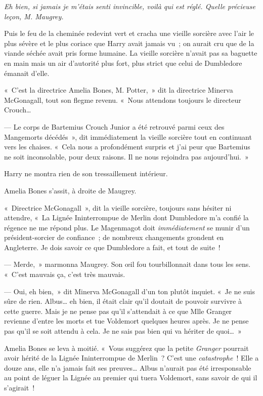 \emph{Eh bien, si jamais je m'étais senti invincible, voilà qui est réglé.
Quelle précieuse leçon, M. Maugrey.}

Puis le feu de la cheminée redevint vert et cracha une vieille sorcière avec l'air le plus sévère et le plus coriace que Harry avait jamais vu~; on aurait cru que de la viande séchée avait pris forme humaine.
La vieille sorcière n'avait pas sa baguette en main mais un air d'autorité plus fort, plus strict que celui de Dumbledore émanait d'elle.

«~C'est la directrice Amelia Bones, M. Potter,~» dit la directrice Minerva McGonagall, tout son flegme revenu.
«~Nous attendons toujours le directeur Crouch…

--- Le corps de Bartemius Crouch Junior a été retrouvé parmi ceux des Mangemorts décédés~», dit immédiatement la vieille sorcière tout en continuant vers les chaises.
«~Cela nous a profondément surpris et j'ai peur que Bartemius ne soit inconsolable, pour deux raisons.
Il ne nous rejoindra pas aujourd'hui.~»

Harry ne montra rien de son tressaillement intérieur.

Amelia Bones s'assit, à droite de Maugrey.

«~Directrice McGonagall~», dit la vieille sorcière, toujours sans hésiter ni attendre, «~La Lignée Ininterrompue de Merlin dont Dumbledore m'a confié la régence ne me répond plus.
Le Magenmagot doit \emph{immédiatement} se munir d'un président-sorcier de confiance~; de nombreux changements grondent en Angleterre.
Je dois savoir ce que Dumbledore a fait, et tout de suite~!

--- Merde,~» marmonna Maugrey.
Son œil fou tourbillonnait dans tous les sens.
«~C'est mauvais ça, c'est très mauvais.

--- Oui, eh bien,~» dit Minerva McGonagall d'un ton plutôt inquiet.
«~Je ne suis sûre de rien.
Albus… eh bien, il était clair qu'il doutait de pouvoir survivre à cette guerre.
Mais je ne pense pas qu'il s'attendait à ce que Mlle Granger revienne d'entre les morts et tue Voldemort quelques heures après.
Je ne pense pas qu'il se soit attendu à cela.
Je ne sais pas bien qui va hériter de quoi…~»

Amelia Bones se leva à moitié.
«~Vous suggérez que la petite \emph{Granger} pourrait avoir hérité de la Lignée Ininterrompue de Merlin~?
C'est une \emph{catastrophe}~!
Elle a douze ans, elle n'a jamais fait ses preuves…
Albus n'aurait pas été irresponsable au point de léguer la Lignée au premier qui tuera Voldemort, sans savoir de qui il s'agirait~!

